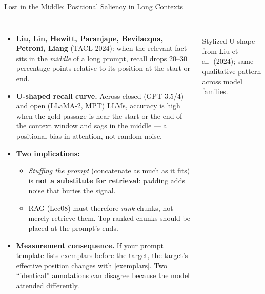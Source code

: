 \begin{frame}{Lost in the Middle: Positional Saliency in Long Contexts}
\begin{columns}[T]
\footnotesize
\begin{itemize}
\item \textbf{Liu, Lin, Hewitt, Paranjape, Bevilacqua, Petroni, Liang} (TACL 2024): when the relevant fact sits in the \emph{middle} of a long prompt, recall drops 20--30 percentage points relative to its position at the start or end.

\medskip
\item \textbf{U-shaped recall curve.} Across closed (GPT-3.5/4) and open (LLaMA-2, MPT) LLMs, accuracy is high when the gold passage is near the start or the end of the context window and sags in the middle --- a positional bias in attention, not random noise.

\medskip
\item \textbf{Two implications:}
\begin{itemize}
    \item \emph{Stuffing the prompt} (concatenate as much as it fits) is \textbf{not a substitute for retrieval}: padding adds noise that buries the signal.
    \item RAG (Lec08) must therefore \emph{rank} chunks, not merely retrieve them. Top-ranked chunks should be placed at the prompt's ends.
\end{itemize}

\medskip
\item \textbf{Measurement consequence.} If your prompt template lists exemplars before the target, the target's effective position changes with $|\text{exemplars}|$. Two ``identical'' annotations can disagree because the model attended differently.
\end{itemize}

\centering
{}\\
{\scriptsize Stylized U-shape from Liu et al.\ (2024); same qualitative pattern across model families.}
\end{columns}
\end{frame}

